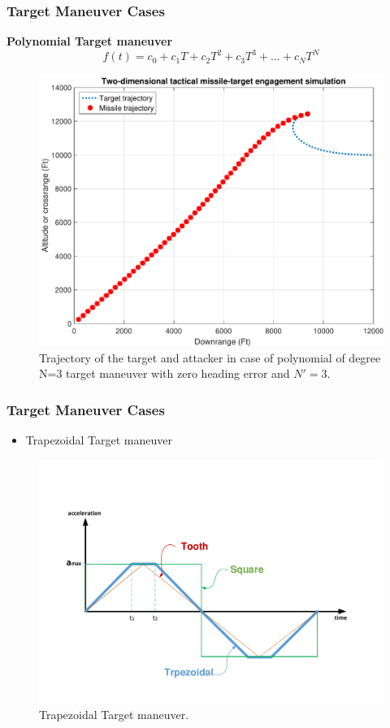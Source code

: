 \documentclass{beamer}
\begin{document}
\begin{frame}
\frametitle{Target Maneuver Cases}
\textbf{Polynomial Target maneuver}\\
\begin{equation}
f(t) = c_0 + c_1 T + c_2 T^2 + c_3 T^3 + ... + c_N T^N
\end{equation} 
\begin{figure}[H]
	\centering
	\includegraphics[scale = 0.2]{fig/trajectoryP3N3.pdf}
	\caption{Trajectory of the target and attacker in case of polynomial of degree N=3 target maneuver with zero heading error and $N'=3$.}
	\label{trajectoryP3}
\end{figure}
\end{frame}
\begin{frame}
\frametitle{Target Maneuver Cases}
\begin{itemize}
	\item Trapezoidal Target maneuver
\end{itemize}
\begin{figure}[htb]
	\centering
	\includegraphics[scale = 0.25]{fig/toothSquareTrapezoidal.pdf}
	\caption{Trapezoidal Target maneuver.}
	\label{trapezoidalacc}
\end{figure}
\end{frame}
\end{document}

